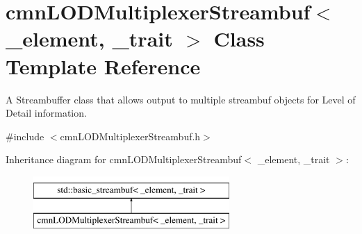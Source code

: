 \hypertarget{classcmn_l_o_d_multiplexer_streambuf}{}\section{cmn\+L\+O\+D\+Multiplexer\+Streambuf$<$ \+\_\+element, \+\_\+trait $>$ Class Template Reference}
\label{classcmn_l_o_d_multiplexer_streambuf}


A Streambuffer class that allows output to multiple streambuf objects for Level of Detail information.  




{\ttfamily \#include $<$cmn\+L\+O\+D\+Multiplexer\+Streambuf.\+h$>$}

Inheritance diagram for cmn\+L\+O\+D\+Multiplexer\+Streambuf$<$ \+\_\+element, \+\_\+trait $>$\+:\begin{figure}[H]
\begin{center}
\leavevmode
\includegraphics[height=2.000000cm]{d7/dfe/classcmn_l_o_d_multiplexer_streambuf}
\end{center}
\end{figure}
